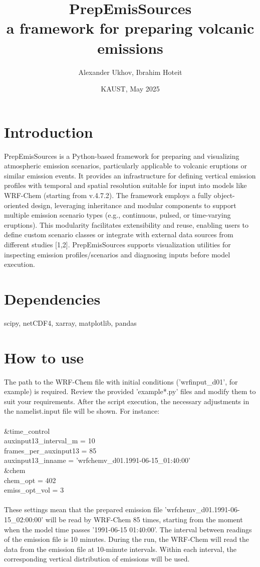 \documentclass{article}
\title{PrepEmisSources \\ a framework for preparing volcanic emissions}
\author{Alexander Ukhov, Ibrahim Hoteit}
\date{KAUST, May 2025}
\begin{document}
\maketitle

\section{Introduction}
PrepEmisSources is a Python-based framework for preparing and visualizing atmospheric emission scenarios, particularly applicable to volcanic eruptions or similar emission events. It provides an infrastructure for defining vertical emission profiles with temporal and spatial resolution suitable for input into models like WRF-Chem (starting from v.4.7.2). The framework employs a fully object-oriented design, leveraging inheritance and modular components to support multiple emission scenario types (e.g., continuous, pulsed, or time-varying eruptions). This modularity facilitates extensibility and reuse, enabling users to define custom scenario classes or integrate with external data sources from different studies [1,2]. PrepEmisSources supports visualization utilities for inspecting emission profiles/scenarios and diagnosing inputs before model execution.

\section{Dependencies}

scipy, netCDF4, xarray, matplotlib, pandas

\section{How to use}
The path to the WRF-Chem file with initial conditions ('wrfinput\_d01', for example) is required. Review the provided 'example*.py' files and modify them to suit your requirements. After the script execution, the necessary adjustments in the namelist.input file will be shown. For instance: \\ \\
    \&time\_control  \\
        auxinput13\_interval\_m = 10 \\
        frames\_per\_auxinput13 = 85 \\
        auxinput13\_inname     = 'wrfchemv\_d01.1991-06-15\_01:40:00' \\
    \&chem \\
        chem\_opt               = 402   \\
        emiss\_opt\_vol          = 3    \\ \\
These settings mean that the prepared emission file 'wrfchemv\_d01.1991-06-15\_02:00:00' will be read by WRF-Chem 85 times, starting from the moment when the model time passes '1991-06-15 01:40:00'. The interval between readings of the emission file is 10 minutes. During the run, the WRF-Chem will read the data from the emission file at 10-minute intervals. Within each interval, the corresponding vertical distribution of emissions will be used.
\end{document}
